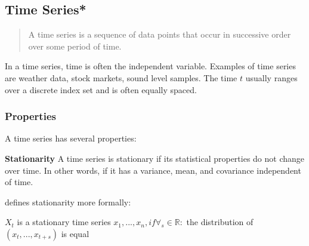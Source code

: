 \subsection{Time Series*}
\label{sec:time series}
\begin{quote}
  A time series is a sequence of data
  points that occur in successive order over some period of time.
\end{quote}
\cite{Hayes}

In a time series, time is often the independent variable.
Examples of time series are weather data, stock markets, sound level samples.
The time $t$ usually ranges over a discrete index set and is often equally spaced.

\subsubsection{Properties}
A time series has several properties:


\textbf{Stationarity}
A time series is stationary if its statistical properties do not change over time.
In other words, if it has a variance, mean, and covariance independent of time.

\cite{RobJHyndman2014} defines stationarity more formally:
\begin{definition}
  $X_t$ is a stationary time series
  $x_1, ..., x_n, if \forall_s \in \mathbb{R} :$
  the distribution of $(x_t, ..., x_{t+s})$ is equal
\end{definition}

